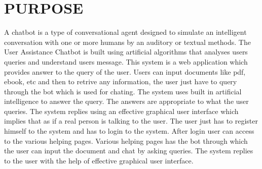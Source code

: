 \documentclass[12pt,a4paper,oneside]{report}
\begin{document}
\section{PURPOSE}
\par 
A chatbot is a type of conversational agent designed to simulate an intelligent conversation with one or more humans by an auditory or textual methods. The User Assistance Chatbot is built using artificial algorithms that analyses users queries and understand users message. This system is a web application which provides answer to the query of the user. Users can input documents like pdf, ebook, etc and then to retrive any information, the user just have to query through the bot which is used for chating. The system uses built in artificial intelligence to answer the query. The answers are appropriate to what the user queries. The system replies using an effective graphical user interface which implies that as if a real person is talking to the user. The user just has to register himself to the system and has to login to the system. After login user can access to the various helping pages. Various helping pages has the bot through which the user can input the document and chat by asking queries. The system replies to the user with the help of effective graphical user interface.
\end{document}
